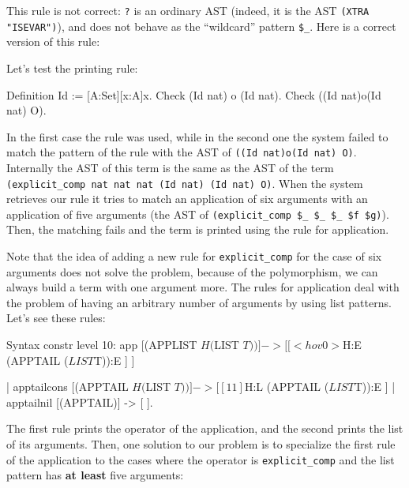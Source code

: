 This rule is not correct: \verb+?+ is an ordinary AST (indeed, it is
the AST \verb|(XTRA "ISEVAR")|), and does not behave as the
``wildcard'' pattern \verb|$_|. Here is a correct version of this
rule:


Let's test the printing rule:

\begin{coq_example}
Definition Id := [A:Set][x:A]x.
Check (Id nat) o (Id nat).
Check ((Id nat)o(Id nat)  O).
\end{coq_example}

In the first case the rule was used, while in the second one the
system failed to match the pattern of the rule with the AST of
\verb+((Id nat)o(Id nat) O)+.
Internally the AST of this term is the same as the AST of the
term \verb+(explicit_comp nat nat nat (Id nat) (Id nat) O)+.
When the system retrieves our rule it tries to match an application of
six arguments with an application of five arguments (the AST of
\verb+(explicit_comp $_ $_ $_ $f $g)+).  Then, the matching fails and
the term is printed using the rule for application.

Note that the idea of adding a new rule for \verb+explicit_comp+ for
the case of six arguments does not solve the problem, because of the
polymorphism, we can always build a term with one argument more.  The
rules for application deal with the problem of having an arbitrary
number of arguments by using list patterns. Let's see these rules:

\begin{coq_example*}
Syntax constr level 10:
  app [(APPLIST $H ($LIST $T))] ->
      [ [<hov 0>  $H:E (APPTAIL ($LIST $T)):E ] ]

| apptailcons [(APPTAIL $H ($LIST $T))] ->
      [ [1 1] $H:L (APPTAIL ($LIST $T)):E ]
| apptailnil [(APPTAIL)] -> [ ].
\end{coq_example*}

The first rule prints the operator of the application, and the second
prints the list of its arguments. Then, one solution to our problem is
to specialize the first rule of the application to the cases where the
operator is \verb+explicit_comp+ and the list pattern has {\bf at
least} five arguments:


